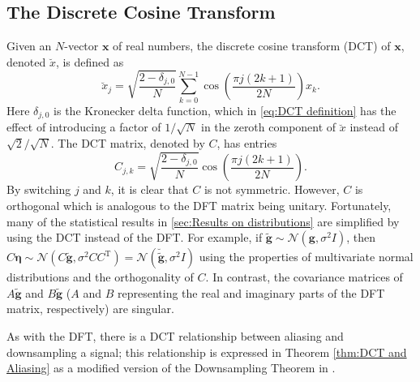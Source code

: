 \documentclass[12pt]{article}
\newcommand{\gVec}{\mathbf{g}}	%
\newcommand{\gnoiseVec}{\widetilde{\mathbf{g}}}	%
\newcommand{\trans}{\mathrm{T}}	%
\newcommand{\dct}[1]{\breve{#1}}	%
\newcommand{\noise}{\eta}	%
\newcommand{\noiseSD}{\sigma}	%
\newcommand{\noiseVec}{\bm{\noise}}	%
\begin{document}
\subsection{The Discrete Cosine Transform} \label{sec:The Discrete Cosine Transform}

Given an $N$-vector $\mathbf{x}$ of real numbers, the discrete cosine transform (DCT) of $\mathbf{x}$, denoted $\dct{x}$, is defined as
\begin{equation}
\label{eq:DCT definition}
\dct{x}_j = \sqrt{\frac{2 - \delta_{j,0}}{N}} \sum_{k=0}^{N-1} \cos\left(\frac{\pi{j}(2k + 1)}{2N}\right) x_k.
\end{equation}
Here $\delta_{j,0}$ is the Kronecker delta function, which in \eqref{eq:DCT definition} has the effect of introducing a factor of $1/\sqrt{N}$ in the zeroth component of $\dct{x}$ instead of $\sqrt{2}/\sqrt{N}$. The DCT matrix, denoted by $C$, has entries
\begin{equation}
\label{eq:DCT matrix}
C_{j,k} = \sqrt{\frac{2 - \delta_{j,0}}{N}} \cos\left(\frac{\pi{j}(2k + 1)}{2N}\right).
\end{equation}
By switching $j$ and $k$, it is clear that $C$ is not symmetric. However, $C$ is orthogonal which is analogous to the DFT matrix being unitary. Fortunately, many of the statistical results in \ref{sec:Results on distributions} are simplified by using the DCT instead of the DFT. For example, if $\gnoiseVec \sim \mathcal{N}(\gVec,\noiseSD^2 I)$, then $C\noiseVec \sim \mathcal{N}(C\gnoiseVec,\noiseSD^2 CC^\trans) = \mathcal{N}(\dct{\gnoiseVec},\noiseSD^2 I)$ using the properties of multivariate normal distributions and the orthogonality of $C$. In contrast, the covariance matrices of $A\gnoiseVec$ and $B\gnoiseVec$ ($A$ and $B$ representing the real and imaginary parts of the DFT matrix, respectively) are singular. \par 
As with the DFT, there is a DCT relationship between aliasing and downsampling a signal; this relationship is expressed in Theorem \ref{thm:DCT and Aliasing} as a modified version of the Downsampling Theorem in \cite{AudioDFT}.
\end{document}
